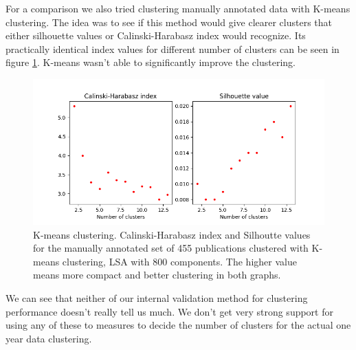 

For a comparison we also tried clustering manually annotated data
with K-means clustering. The idea was to see if this method would
give clearer clusters that either silhouette values or 
Calinski-Harabasz index would recognize. Its practically identical
index values for different number of clusters can be seen in 
figure \ref{fig:ch-silh02}. K-means wasn't able to significantly 
improve the clustering.

\begin{figure}[htp]
  \begin{center}    
\includegraphics[width=11.5cm]{images/c-h-silh-index-plot-455-2_12-800-kmeans.png}
    \caption{K-means clustering. Calinski-Harabasz index and Silhoutte values for the
    manually annotated set of 455 publications clustered with K-means 
    clustering, LSA with 800 components. The higher value means
    more compact and better clustering in both graphs.}
    \label{fig:ch-silh02}
  \end{center}
\end{figure}

We can see that neither of our internal validation method for 
clustering performance doesn't really tell us much. 
We don't get very strong support for using any of these to measures
to decide the number of clusters for the actual one year data 
clustering.



